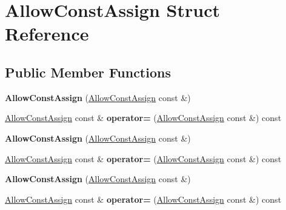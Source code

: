 \hypertarget{struct_allow_const_assign}{}\section{Allow\+Const\+Assign Struct Reference}
\label{struct_allow_const_assign}
\subsection*{Public Member Functions}
\begin{DoxyCompactItemize}
\item 
\mbox{\label{struct_allow_const_assign_a4441a1e863481d20cf157684c78d7e80}} 
{\bfseries Allow\+Const\+Assign} (\mbox{\hyperlink{struct_allow_const_assign}{Allow\+Const\+Assign}} const \&)
\item 
\mbox{\label{struct_allow_const_assign_ae2e965ed57f812999effc727f9d96aee}} 
\mbox{\hyperlink{struct_allow_const_assign}{Allow\+Const\+Assign}} const  \& {\bfseries operator=} (\mbox{\hyperlink{struct_allow_const_assign}{Allow\+Const\+Assign}} const \&) const
\item 
\mbox{\label{struct_allow_const_assign_a4441a1e863481d20cf157684c78d7e80}} 
{\bfseries Allow\+Const\+Assign} (\mbox{\hyperlink{struct_allow_const_assign}{Allow\+Const\+Assign}} const \&)
\item 
\mbox{\label{struct_allow_const_assign_ae2e965ed57f812999effc727f9d96aee}} 
\mbox{\hyperlink{struct_allow_const_assign}{Allow\+Const\+Assign}} const  \& {\bfseries operator=} (\mbox{\hyperlink{struct_allow_const_assign}{Allow\+Const\+Assign}} const \&) const
\item 
\mbox{\label{struct_allow_const_assign_a4441a1e863481d20cf157684c78d7e80}} 
{\bfseries Allow\+Const\+Assign} (\mbox{\hyperlink{struct_allow_const_assign}{Allow\+Const\+Assign}} const \&)
\item 
\mbox{\label{struct_allow_const_assign_ae2e965ed57f812999effc727f9d96aee}} 
\mbox{\hyperlink{struct_allow_const_assign}{Allow\+Const\+Assign}} const  \& {\bfseries operator=} (\mbox{\hyperlink{struct_allow_const_assign}{Allow\+Const\+Assign}} const \&) const
\end{DoxyCompactItemize}


